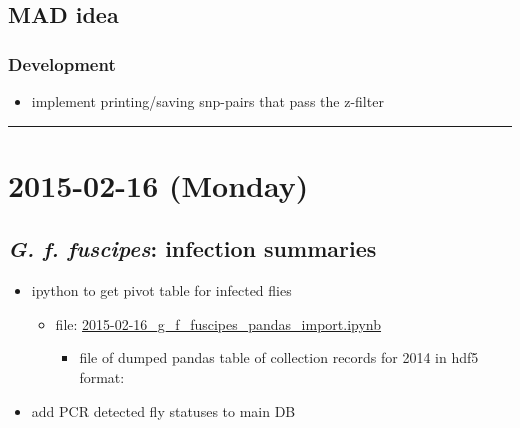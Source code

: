 \documentclass[letterpaper]{scrartcl}
\begin{document}
\subsection{MAD idea}\label{mad-idea-4}

\subsubsection{Development}\label{development-4}

\begin{itemize}
\itemsep1pt\parskip0pt
\item
  implement printing/saving snp-pairs that pass the z-filter
\end{itemize}

\begin{center}\rule{0.5\linewidth}{\linethickness}\end{center}

\section{2015-02-16 (Monday)}\label{monday-2}

\subsection{\emph{G. f. fuscipes}: infection
summaries}\label{g.-f.-fuscipes-infection-summaries}

\begin{itemize}
\itemsep1pt\parskip0pt
\item
  ipython to get pivot table for infected flies

  \begin{itemize}
  \itemsep1pt\parskip0pt
  \item
    file:
    \href{file:///home/gus/Dropbox/common/ipy_notebooks/YALE/g_f_fuscipes_general/2015-02-16_g_f_fuscipes_pandas_import.ipynb}{2015-02-16\_g\_f\_fuscipes\_pandas\_import.ipynb}

    \begin{itemize}
    \itemsep1pt\parskip0pt
    \item
      file of dumped pandas table of collection records for 2014 in hdf5
      format:
    \end{itemize}
  \end{itemize}
\item
  add PCR detected fly statuses to main DB
\end{itemize}
\end{document}
